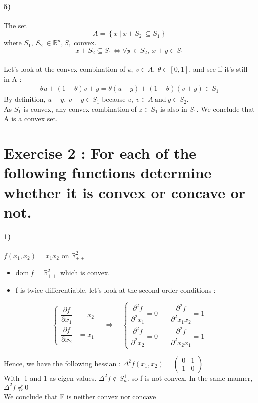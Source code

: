 \documentclass[12pt,a4paper]{article}
\begin{document}
\paragraph{5)} The set $$A= \left\lbrace x~|~x+S_2 ~\subseteq S_1\right\rbrace $$ where $ S_1,~S_2~\in \mathbb{R}^n $,$ ~S_1 $ convex.\\
\begin{equation*}
	x+S_2 \subseteq S_1 \Leftrightarrow \forall y~\in S_2,~x+y\in S_1
\end{equation*}
\\
Let's look at the convex combination of $ u,~v \in A,~\theta \in [0,1] $, and see if it's still in A :\\
\begin{align*}
	\theta u + (1-\theta)v  + y = \theta(u+y) + (1-\theta)(v+y) \in S_1
\end{align*}
By definition, $ u+y,~v+y \in S_1 $ because $ u,~v \in A~\text{and}~y \in S_2 $. \\
As $ S_1 $ is convex, any convex combination of $ z \in S_1 $ is also in $ S_1 $. 
We conclude that A is a convex set.
\section{\textbf{Exercise 2 : }For each of the following functions determine whether it is convex or concave or not.}
\paragraph{1)} $ f(x_1,x_2)=x_1x_2 $ on $ \mathbb{R}^2_{++} $
\begin{itemize}
	\item $ \text{dom} ~f=\mathbb{R}^2_{++} $ which is convex.
	\item f is twice differentiable, let's look at the second-order conditions :\\

 \end{itemize}
 \begin{center}
$$	\begin{cases}
			\dfrac{\partial f}{\partial x_1} &=  x_2 \\
			\dfrac{\partial f}{\partial x_2} &=  x_1 
		\end{cases}
		\quad 
		\Rightarrow
		\quad
		\left\lbrace
		\begin{matrix}
			\dfrac{\partial^2 f}{\partial^2 x_1} =  0 \quad 
			&\dfrac{\partial^2 f}{\partial^2 x_1x_2} =  1 \\
			\dfrac{\partial^2 f}{\partial^2 x_2} =  0 \quad  
							     &\dfrac{\partial^2 f}{\partial^2 x_2x_1} =  1 
		\end{matrix} \right.	$$
	\end{center}
	Hence, we have the following hessian : \def\arraystretch{2} $ \Delta^2 f(x_1,x_2)=	\begin{pmatrix}
		0 & 1 \\
		1 & 0	 
        \end{pmatrix} $\\
With -1 and 1 as eigen values. $ \Delta^2 f \notin S_n^{+} $, so f is not convex. In the same manner, $\Delta^2 f \npreceq 0$
\\ We conclude that F is neither convex nor concave\\
\end{document}
